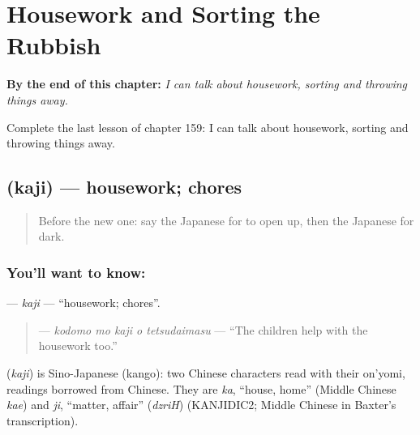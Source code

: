 
\chapter{Housework and Sorting the Rubbish}
\label{ch:ja-housework-and-sorting-the-rubbish}

\begin{chapteropening}
\textbf{By the end of this chapter:} \emph{I can talk about housework, sorting and throwing things away.}

Complete the last lesson of chapter 159: I can talk about housework, sorting and throwing things away.
\end{chapteropening}

\section[\texorpdfstring{\ja{かじ} (kaji)}{かじ (kaji)}]{ (kaji) — housework; chores}

\label{lesson:JA-C159-kaji}



\begin{quote}
Before the new one: say the Japanese for to open up, then the Japanese for dark.
\end{quote}

\subsection*{You'll want to know: }
\textbf{} — \emph{kaji} — \textquotedblleft{}housework; chores\textquotedblright{}.

\begin{quote}
\textbf{  } — \emph{kodomo mo kaji o tetsudaimasu} — \textquotedblleft{}The children help with the housework too.\textquotedblright{}
\end{quote}

\begin{cousinweb}
\textbf{} (\emph{kaji}) is Sino-Japanese (kango): two Chinese characters read with their on'yomi, readings borrowed from Chinese. They are \emph{ka}, \textquotedblleft{}house, home\textquotedblright{} (Middle Chinese \emph{kae}) and \emph{ji}, \textquotedblleft{}matter, affair\textquotedblright{} (\emph{dzriH}) (KANJIDIC2; Middle Chinese in Baxter's transcription).
\end{cousinweb}

